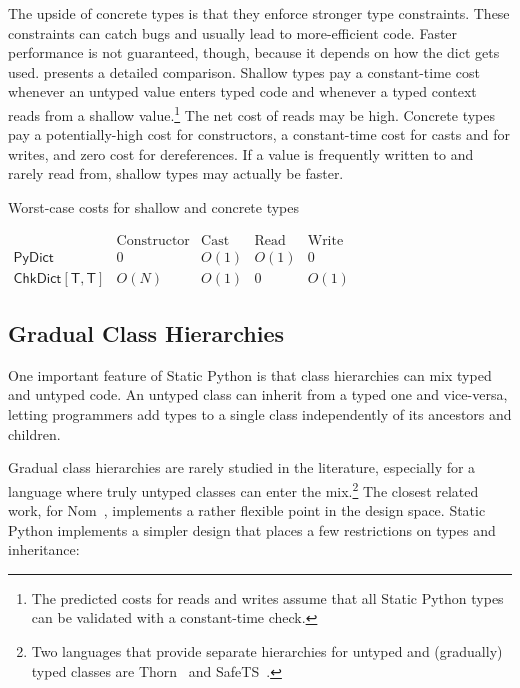 \documentclass[english,cleveref,submission]{programming}
\newcommand{\SP}{Static Python}
\newcommand{\typefont}[1]{\mathsf{#1}}
\newcommand{\paramtype}[2]{#1[#2]}
\newcommand{\sptype}{\typefont{T}}
\newcommand{\sptrawpydict}{\typefont{PyDict}}
\newcommand{\sptchkdict}[2]{\paramtype{\typefont{ChkDict}}{#1, #2}}
\begin{document}
The upside of concrete types is that they enforce stronger type constraints.
These constraints can catch bugs and usually lead to more-efficient code.
Faster performance is not guaranteed, though, because it depends on how the dict
gets used.
 presents a detailed comparison.
Shallow types pay a constant-time cost whenever an untyped value enters typed code
and whenever a typed context reads from a shallow value.\footnote{The predicted
costs for reads and writes assume that all \SP{} types can be validated with a
constant-time check.}
The net cost of reads may be high.
Concrete types pay a potentially-high cost for constructors,
a constant-time cost for casts and for writes,
and zero cost for dereferences.
If a value is frequently written to and rarely read from, shallow types may actually
be faster.

\begin{table}[t]
  \caption{Worst-case costs for shallow and concrete types}
  \label{t:shallow-vs-concrete}

  \centering
  \(\begin{array}{lrrrr}
     & \mbox{Constructor} & \mbox{Cast} & \mbox{Read} & \mbox{Write} \\\hline
    \sptrawpydict                &           0 & O(1) & O(1) &     0 \\
    \sptchkdict{\sptype}{\sptype} &        O(N) & O(1) &    0 &  O(1)
  \end{array}\)
\end{table}



\subsection{Gradual Class Hierarchies}
\label{s:inheritance}

One important feature of \SP{} is that class hierarchies can
mix typed and untyped code.
An untyped class can inherit from a typed one and vice-versa,
letting programmers add types to a single class independently of its ancestors
and children.


Gradual class hierarchies are rarely studied in the literature, especially
for a language where truly untyped classes can enter the mix.\footnote{Two
languages that provide separate hierarchies for untyped and (gradually) typed
classes are Thorn~\cite{wzlov-popl-2010} and SafeTS~\cite{rsfbv-popl-2015}.}
The closest related work, for Nom~\cite{mt-oopsla-2017}, implements
a rather flexible point in the design space.
\SP{} implements a simpler design that places a few restrictions on types and
inheritance:
\end{document}
